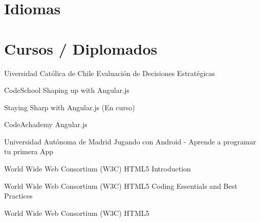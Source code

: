 \documentclass[]{cvStyle1}
\begin{document}
    \section*{Idiomas}
        
    
        
        
        
        
        
        
        
        
    \section*{Cursos / Diplomados}
        \skill
			{Uiversidad Cat\'olica de Chile}
			{Evaluaci\'on de Decisiones Estrat\'egicas}
              
        \skill
			{CodeSchool}
			{Shaping up with Angular.js}
        
        \skill
			{}
			{Staying Sharp with Angular.js (En curso)}
        
        \skill
			{CodeAchademy}
			{Angular.js}
        
        \skill
			{Universidad Aut\'onoma de Madrid}
			{Jugando con Android - Aprende a programar tu primera App}
        
        \skill
			{World Wide Web Consortium (W3C)}
			{HTML5 Introduction}
        
        \skill
			{World Wide Web Consortium (W3C)}
            {HTML5 Coding Essentials and Best Practices}
            
        \skill
			{World Wide Web Consortium (W3C)}
			{HTML5 }
            
\end{document}
